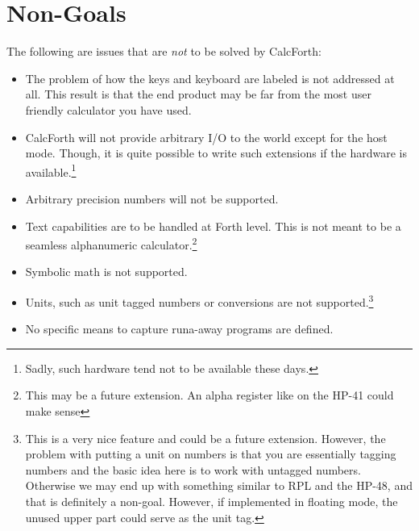 \documentclass[a4paper]{article}
\begin{document}
\section{Non-Goals}
The following are issues that are {\it not\/} to be solved by CalcForth:
\begin{itemize}
\item The problem of how the keys and keyboard are labeled is not addressed at all. This result is that the end product may be far from the most user friendly calculator you have used.
\item CalcForth will not provide arbitrary I/O to the world except for the host mode. Though, it is quite possible to write such extensions if the hardware is available.\footnote{Sadly, such hardware tend not to be available these days.}
\item Arbitrary precision numbers will not be supported.
\item Text capabilities are to be handled at Forth level. This is not meant to be a seamless alphanumeric calculator.\footnote{This may be a future extension. An alpha register like on the HP-41 could make sense}
\item Symbolic math is not supported.
\item Units, such as unit tagged numbers or conversions are not supported.\footnote{This is a very nice feature and could be a future extension. However, the problem with putting a unit on numbers is that you are essentially tagging numbers and the basic idea here is to work with untagged numbers. Otherwise we may end up with something similar to RPL and the HP-48, and that is definitely a non-goal. However, if implemented in floating mode, the unused upper part could serve as the unit tag.}
\item No specific means to capture runa-away programs are defined.
\end{itemize}
\end{document}
